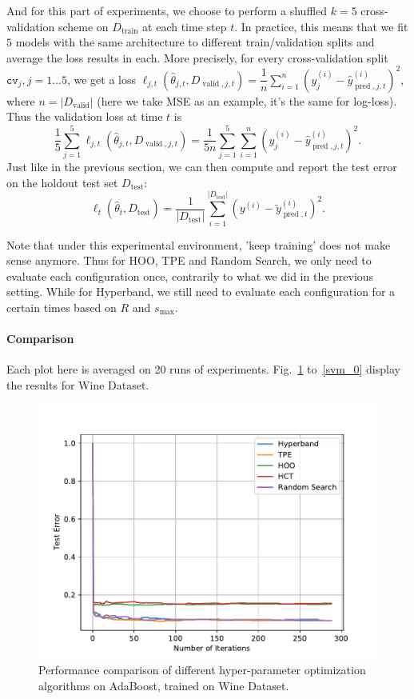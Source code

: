 \documentclass[twoside,11pt]{article}
\begin{document}
And for this part of experiments, we choose to perform a shuffled $k=5$ cross-validation scheme on $D_{\operatorname{train}}$ at each time step $t$. In practice, this means that we fit $5$ models with the same architecture to different train/validation splits and average the loss results in each. More precisely, for every cross-validation split 
$\mathtt{cv}_j,j=1\ldots5$, we get a loss $\ell_{j,t}(\hat{\theta}_{j,t}, D_{\operatorname{valid},j,t}) = \dfrac{1}{n} \sum^{n}_{i=1} \left(y^{(i)}_{j} - \hat{y}^{(i)}_{\operatorname{pred},j,t}\right)^2$, where $n=|D_{\operatorname{valid}}|$ (here we take MSE as an example, it's the same for log-loss). Thus the validation loss at time $t$ is
\[
\frac{1}{5}\sum_{j=1}^{5}\ell_{j,t}(\hat{\theta}_{j,t}, D_{\operatorname{valid},j,t}) = \frac{1}{5n}\sum_{j=1}^{5} \sum_{i=1}^n \left(y^{(i)}_{j} - \hat{y}^{(i)}_{\operatorname{pred},j,t}\right)^2.
\]
Just like in the previous section, we can then compute and report the test error on the holdout test set $D_{\operatorname{test}}$:
\[
\ell_{t}(\hat{\theta}_t, D_{\operatorname{test}}) = \frac{1}{|D_{\operatorname{test}}|} \sum_{i=1}^{|D_{\operatorname{test}}|} \left(y^{(i)} - \tilde{y}^{(i)}_{\operatorname{pred},t}\right)^2.
\]

Note that under this experimental environment, 'keep training' does not make sense anymore. Thus for HOO, TPE and Random Search, we only need to evaluate each configuration once, contrarily to what we did in the previous setting. While for Hyperband, we still need to evaluate each configuration for a certain times based on $R$ and $s_{\max}$.

\paragraph{\textbf{Comparison}} Each plot here is averaged on 20 runs of experiments. Fig.~\ref{ada_0} to~\ref{svm_0} display the results for Wine Dataset.

\begin{figure}[ht]
    \centering
    \includegraphics[scale=0.8]{img/uci/ada_0.pdf}
    \caption{Performance comparison of different hyper-parameter optimization algorithms on AdaBoost, trained on Wine Dataset.}
    \label{ada_0}
\end{figure}
\end{document}
